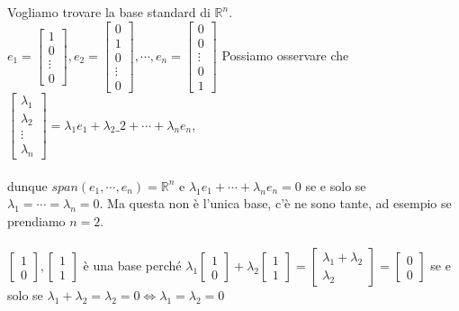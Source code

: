 \begin{example}
Vogliamo trovare la base standard di $\mathbb{R}^n$.\\
$e_1 = \begin{bmatrix}1\\0\\\vdots\\0\end{bmatrix}, e_2 = \begin{bmatrix}0\\1\\0\\\vdots\\0\end{bmatrix}, \cdots, e_n = \begin{bmatrix}0\\0\\\vdots\\0\\1\end{bmatrix}$
Possiamo osservare che $\begin{bmatrix}\lambda_1\\\lambda_2\\\vdots\\\lambda_n\end{bmatrix} = \lambda_1 e_1 + \lambda_2 \_2 + \cdots + \lambda_ne_n$,\\\\
dunque $span(e_1, \cdots, e_n) = \mathbb{R}^n$ e $\lambda_1e_1 + \cdots + \lambda_ne_n = 0$ se e solo se $\lambda_1= \cdots = \lambda_n = 0$. Ma questa non è l'unica base, c'è ne sono tante, ad esempio se prendiamo $n=2$.\\\\
$\begin{bmatrix}1\\0\end{bmatrix}, \begin{bmatrix}1\\1\end{bmatrix}$ è una base perché $\lambda_1\begin{bmatrix}1\\0\end{bmatrix} + \lambda_2\begin{bmatrix}1\\1\end{bmatrix} = \begin{bmatrix}\lambda_1 + \lambda_2\\\lambda_2\end{bmatrix} = \begin{bmatrix}0\\0\end{bmatrix}$ se e solo se $\lambda_1 + \lambda_2 = \lambda_2 = 0 \Longleftrightarrow \lambda_1 = \lambda_2 = 0$
\end{example}

